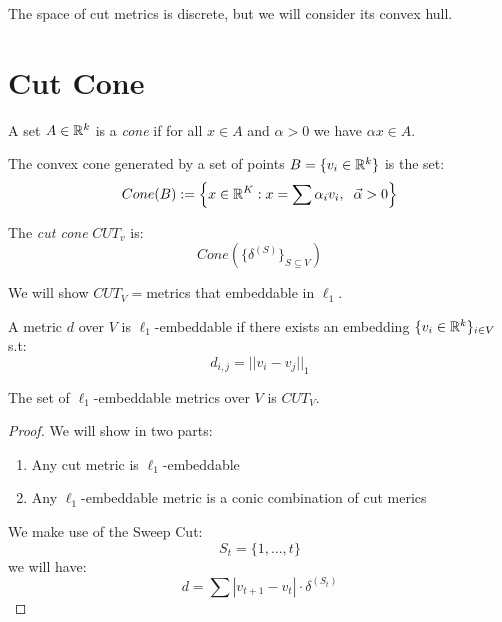 \documentclass[11pt]{article}
\begin{document}
The space of cut metrics is discrete, but we will consider its convex hull.
\section*{Cut Cone}
\begin{definition}
[Cone]
A set $A \in \mathbb{R}^k$ is a \emph{cone} if for all $x\in A$ and $\alpha >0$ we have $\alpha x\in A$.
\end{definition}
\begin{definition}
The convex cone generated by a set of points $B= \{v_i \in \mathbb{R}^k\}$ is the set:
\[
    Cone (B):= \left\{x \in \mathbb{R}^K: x = \sum \alpha_i v_i,\hspace{2mm} \vec{\alpha} >0 \right\}
\]
\end{definition}
\begin{definition}
The \emph{cut cone} $CUT_v$ is:
\[
    Cone(\{\delta^{(S)}\}_{S\subseteq V})
\]
\end{definition}
We will show $CUT_V =$metrics that embeddable in $\ell_1$.

\begin{definition}
A metric $d$ over $V$ is $\ell_1$-embeddable if there exists an embedding $\{v_i \in \mathbb{R}^k\}_{i\in V}$ s.t:
\[
    d_{i,j} =||v_i - v_j||_1
\]
\end{definition}
\begin{theorem}
The set of $\ell_1$-embeddable metrics over $V$ is $CUT_V$.
\end{theorem}
\begin{proof}
We will show in two parts:
\begin{enumerate}
    \item Any cut metric is $\ell_1$-embeddable
    \item Any $\ell_1$-embeddable metric is a conic combination of cut merics
\end{enumerate}
We make use of the Sweep Cut:
\[
    S_t= \{1, ... ,t\}
\]
we will have:
\[
    d = \sum|v_{t+1}- v_t|\cdot \delta^{(S_t)}
\]
\end{proof}
\end{document}
